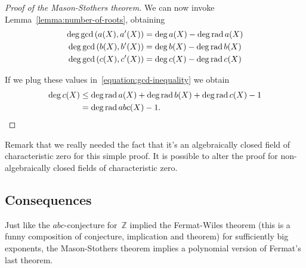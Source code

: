 \begin{proof}[Proof of the Mason-Stothers theorem]
  We can now invoke Lemma~\ref{lemma:number-of-roots}, obtaining
  \begin{equation}
    \begin{aligned}
      \deg\gcd\left( a(X),a'(X) \right)&=\deg a(X)-\deg\operatorname{rad} a(X) \\
      \deg\gcd\left( b(X),b'(X) \right)&=\deg b(X)-\deg\operatorname{rad} b(X) \\
      \deg\gcd\left( c(X),c'(X) \right)&=\deg c(X)-\deg\operatorname{rad} c(X)
    \end{aligned}
  \end{equation}

  If we plug these values in~\eqref{equation:gcd-inequality} we obtain
  \begin{equation}
    \begin{aligned}
      \deg c(X)&\leq\deg\operatorname{rad} a(X)+\deg\operatorname{rad} b(X)+\deg\operatorname{rad} c(X)-1\\
      &=\deg\operatorname{rad} abc(X)-1.
    \end{aligned}
  \end{equation}

\end{proof}

Remark that we really needed the fact that it's an algebraically closed field of characteristic zero for this simple proof. It is possible to alter the proof for non-algebraically closed fields of characteristic zero.

\subsection{Consequences}
Just like the $abc$\nobreakdash-conjecture for~$\mathbb{Z}$ implied the Fermat-Wiles theorem (this is a funny composition of conjecture, implication and theorem) for sufficiently big exponents, the Mason-Stothers theorem implies a polynomial version of Fermat's last theorem.

